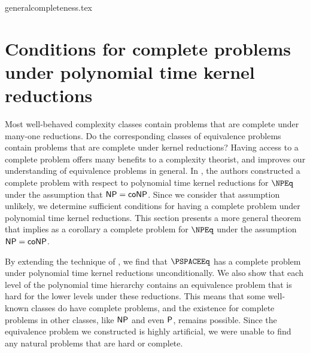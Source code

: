 \begin{filecontents}{generalcompleteness.tex}
\section
    [Conditions for complete problems under polynomial time kernel reductions]
    {Conditions for complete problems \\ under polynomial time kernel reductions}
\label{sec:generalcompleteness}
%
Most well-behaved complexity classes contain problems that are complete under many-one reductions.
Do the corresponding classes of equivalence problems contain problems that are complete under kernel reductions?
Having access to a complete problem offers many benefits to a complexity theorist, and improves our understanding of equivalence problems in general.
In \cite[Theorem~8.7]{bcffm}, the authors constructed a complete problem with respect to polynomial time kernel reductions for $\NPEq$ under the assumption that $\NP = \coNP$.
Since we consider that assumption unlikely, we determine sufficient conditions for having a complete problem under polynomial time kernel reductions.
This section presents a more general theorem that implies as a corollary a complete problem for $\NPEq$ under the assumption $\NP = \coNP$.

%
By extending the technique of \cite[Theorem~8.7]{bcffm}, we find that $\PSPACEEq$ has a complete problem under polynomial time kernel reductions unconditionally.
We also show that each level of the polynomial time hierarchy contains an equivalence problem that is hard for the lower levels under these reductions.
This means that some well-known classes do have complete problems, and the existence for complete problems in other classes, like $\NP$ and even $\P$, remains possible.
Since the equivalence problem we constructed is highly artificial, we were unable to find any natural problems that are hard or complete.


\end{filecontents}
